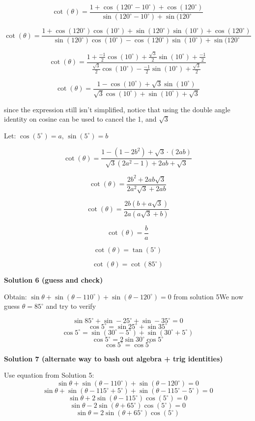\begin{enumerate}
 
 \[\cot(\theta)=\frac{1+\cos(120^\circ-10^\circ)+\cos(120^\circ)}{\sin(120^\circ-10^\circ)+\sin(120^\circ}\]

 \[\cot(\theta)=\frac{1+\cos(120^\circ)\cos(10^\circ)+\sin(120^\circ)\sin(10^\circ)+\cos(120^\circ)} {\sin(120^\circ)\cos(10^\circ)-\cos(120^\circ)\sin(10^\circ)+\sin(120^\circ}\]

 \[\cot(\theta)=\frac{1+\frac{-1}{2}\cos(10^\circ)+\frac{\sqrt{3}}{2}\sin(10^\circ)+\frac{-1}{2}} {\frac{\sqrt{3}}{2}\cos(10^\circ)-\frac{-1}{2}\sin(10^\circ)+\frac{\sqrt{3}}{2}}\]

 \[\cot(\theta)=\frac{1-\cos(10^\circ)+\sqrt{3}\sin(10^\circ)} {\sqrt{3}\cos(10^\circ)+\sin(10^\circ)+\sqrt{3}}\]

 since the expression still isn't simplified, notice that using the double angle identity on cosine can be used to cancel the 1, and $\sqrt{3}$

 Let: $\cos(5^\circ)=a$, $\sin(5^\circ)=b$

 \[\cot(\theta)=\frac{1-(1-2b^2)+\sqrt{3}\cdot(2ab)} {\sqrt{3}(2a^2-1)+2ab+\sqrt{3}}\]

 \[\cot(\theta)=\frac{2b^2+2ab\sqrt{3}} {2a^2\sqrt{3}+2ab}\]

 \[\cot(\theta)=\frac{2b(b+a\sqrt{3})} {2a(a\sqrt{3}+b)}\]

 \[\cot(\theta)=\frac{b}{a}\]

 \[\cot(\theta)=\tan(5^\circ)\]

 \[\cot(\theta)=\cot(85^\circ)\]




\textbf{Solution 6 (guess and check)}

Obtain: $\sin\theta+\sin(\theta-110^\circ)+\sin(\theta-120^\circ)=0$ from solution 5We now guess $\theta=85^\circ$ and try to verify

 
 \[\sin85^\circ+\sin-25^\circ+\sin-35^\circ=0\]
 \[\cos5^\circ=\sin25^\circ+\sin35^\circ\]
 \[\cos5^\circ=\sin(30^\circ-5^\circ)+\sin(30^\circ+5^\circ)\]
 \[\cos5^\circ=2\sin30^\circ\cos5^\circ\]
 \[\cos5^\circ=\cos5^\circ\]




\textbf{Solution 7 (alternate way to bash out algebra + trig identities)}

Use equation from Solution 5: 
 \[\sin\theta+\sin(\theta-110^\circ)+\sin(\theta-120^\circ)=0\]
 \[\sin\theta+\sin(\theta-115^\circ+5^\circ)+\sin(\theta-115^\circ-5^\circ)=0\]
 \[\sin\theta+2\sin(\theta-115^\circ)\cos(5^\circ)=0\]
 \[\sin\theta-2\sin(\theta+65^\circ)\cos(5^\circ)=0\]
 \[\sin\theta=2\sin(\theta+65^\circ)\cos(5^\circ)\]


\end{enumerate}
